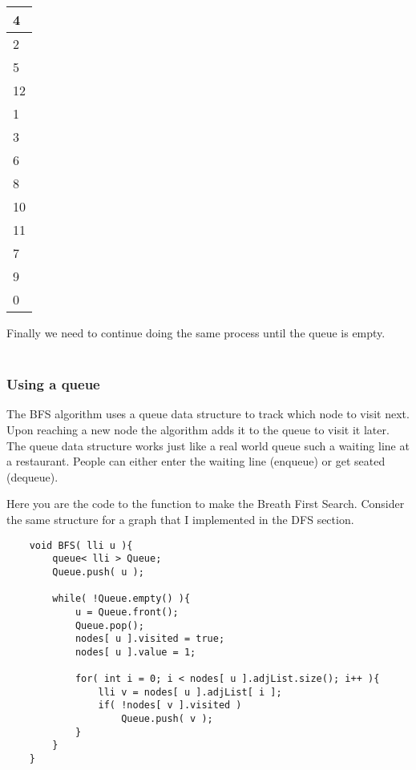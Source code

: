 \begin{table}[H]
    \centering
    \begin{tabular}{|l|}
    \hline
    4                         \\ \hline
    2                         \\ \hline
    5                         \\ \hline
    12                        \\ \hline
    1                         \\ \hline
    \rowcolor[HTML]{EFEFEF} 
    3                         \\ \hline
    \rowcolor[HTML]{EFEFEF} 
    6                         \\ \hline
    \rowcolor[HTML]{EFEFEF} 
    8                         \\ \hline
    \rowcolor[HTML]{EFEFEF} 
    10                        \\ \hline
    \rowcolor[HTML]{EFEFEF} 
    {\color[HTML]{333333} 11} \\ \hline
    \rowcolor[HTML]{EFEFEF} 
    7                         \\ \hline
    \rowcolor[HTML]{EFEFEF} 
    9                         \\ \hline
    \rowcolor[HTML]{EFEFEF} 
    0                         \\ \hline
    \end{tabular}
\end{table}

Finally we need to continue doing the same process until the queue is empty.\\\\

\subsubsection{Using a queue}
The BFS algorithm uses a queue data structure to track which node to visit next. Upon reaching a new node the algorithm adds it to the queue to visit it later. The queue data structure works just like a real world queue such a waiting line at a restaurant. People can either enter the waiting line (enqueue) or get seated (dequeue).

Here you are the code to the function to make the Breath First Search. Consider the same structure for a graph that I implemented in the DFS section.

\begin{lstlisting}
    void BFS( lli u ){
        queue< lli > Queue;
        Queue.push( u );

        while( !Queue.empty() ){
            u = Queue.front();
            Queue.pop();
            nodes[ u ].visited = true;
            nodes[ u ].value = 1;

            for( int i = 0; i < nodes[ u ].adjList.size(); i++ ){
                lli v = nodes[ u ].adjList[ i ];
                if( !nodes[ v ].visited )
                    Queue.push( v );
            }
        }
    }
\end{lstlisting}
